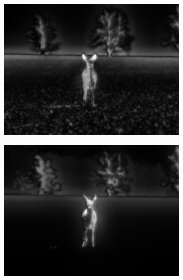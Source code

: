 \begin{figure}[H]
    \begin{subfigure}{.32\textwidth}
      \centering
      \includegraphics[scale=1.0]{obrazky/ittiIntensity23.jpg}
      \caption{}
    \end{subfigure}
    \begin{subfigure}{.32\textwidth}
      \centering
      \includegraphics[scale=1.0]{obrazky/ittiColour23.jpg}
      \caption{}
    \end{subfigure}
    \vspace{2pt}
    \begin{subfigure}{0.32\textwidth}
      \centering

\end{subfigure}
\end{figure}
